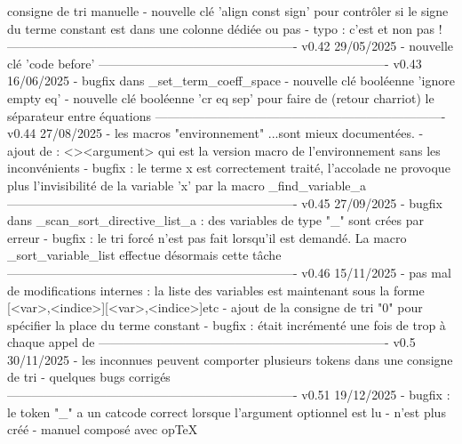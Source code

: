       consigne de tri manuelle
    - nouvelle clé 'align const sign' pour contrôler si le signe du
      terme constant est dans une colonne dédiée ou pas
    - typo : c'est \aligncalc et non pas \aligncal !
----------------------------------------------------------------------
v0.42       29/05/2025
    - nouvelle clé 'code before'
----------------------------------------------------------------------
v0.43       16/06/2025
    - bugfix dans \SYS_set_term_coeff_space
    - nouvelle clé booléenne 'ignore empty eq'
    - nouvelle clé booléenne 'cr eq sep' pour faire de ^^M (retour
      charriot) le séparateur entre équations
----------------------------------------------------------------------
v0.44       27/08/2025
    - les macros "environnement" \SYSmakecrother...\SYSrestorecr sont
      mieux documentées.
    - ajout de \SYSallowcr :
                  \SYSallowcr<\macro>{<argument>}
       qui est la version macro de l'environnement sans les
       inconvénients
    - bugfix : le terme x est correctement traité, l'accolade
      ne provoque plus l'invisibilité de la variable 'x' par la macro
      \SYS_find_variable_a
----------------------------------------------------------------------
v0.45       27/09/2025
    - bugfix dans \SYS_scan_sort_directive_list_a : des variables de
      type "_{}" sont crées par erreur
    - bugfix : le tri forcé n'est pas fait lorsqu'il est demandé. La
      macro \SYS_sort_variable_list effectue désormais cette tâche
----------------------------------------------------------------------
v0.46       15/11/2025
    - pas mal de modifications internes : la liste des variables est
      maintenant sous la forme
                  [<var>,<indice>][<var>,<indice>]etc
    - ajout de la consigne de tri "0" pour spécifier la place du
      terme constant
    - bugfix : \SYSeqnum était incrémenté une fois de trop à chaque
      appel de \systeme
----------------------------------------------------------------------
v0.5        30/11/2025
    - les inconnues peuvent comporter plusieurs tokens dans une
      consigne de tri
    - quelques bugs corrigés
----------------------------------------------------------------------
v0.51       19/12/2025
    - bugfix : le token "_" a un catcode correct lorsque l'argument
      optionnel est lu
    - \normalbaselineskip n'est plus créé
    - manuel composé avec opTeX